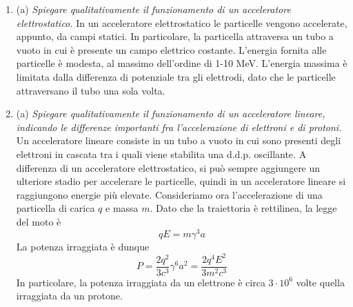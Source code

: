 \documentclass{article}
\renewcommand{\a}{(a)}
\renewcommand{\t}[1]{\textit{ #1}}
\begin{document}
\begin{enumerate}
	\item\a\t{Spiegare qualitativamente il funzionamento di un acceleratore elettrostatico.} In un acceleratore elettrostatico le particelle vengono accelerate, appunto, da campi statici. In particolare, la particella attraversa un tubo a vuoto in cui è presente un campo elettrico costante. L'energia fornita alle particelle è modesta, al massimo dell'ordine di 1-10 MeV. L'energia massima è limitata dalla differenza di potenziale tra gli elettrodi, dato che le particelle attraversano il tubo una sola volta.
	\item\a\t{Spiegare qualitativamente il funzionamento di un acceleratore lineare, indicando
		le differenze importanti fra l’accelerazione di elettroni e di protoni.}
	Un acceleratore lineare consiste in un tubo a vuoto in cui sono presenti degli elettroni in cascata tra i quali viene stabilita una d.d.p. oscillante. A differenza di un acceleratore elettrostatico, si può sempre aggiungere un ulteriore stadio per accelerare le particelle, quindi in un acceleratore lineare si raggiungono energie più elevate. Consideriamo ora l'accelerazione di una particella di carica $q$ e massa $m$. Dato che la traiettoria è rettilinea, la legge del moto è
	\[qE=m\gamma^3 a\]
	La potenza irraggiata è dunque
	\[P=\frac{2q^2}{3c^3}\gamma^6a^2=\frac{2q^4E^2}{3m^2c^3}\]
	In particolare, la potenza irraggiata da un elettrone è circa $3\cdot10^6$ volte quella irraggiata da un protone.
\end{enumerate}
\end{document}
